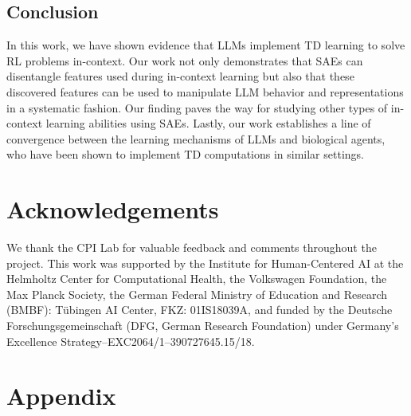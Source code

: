 \documentclass{article}
\begin{document}
\subsection{Conclusion}
In this work, we have shown evidence that LLMs implement TD learning to solve RL problems in-context. Our work not only demonstrates that SAEs can disentangle features used during in-context learning but also that these discovered features can be used to manipulate LLM behavior and representations in a systematic fashion. Our finding paves the way for studying other types of in-context learning abilities using SAEs. Lastly, our work establishes a line of convergence between the learning mechanisms of LLMs and biological agents, who have been shown to implement TD computations in similar settings.
\section*{Acknowledgements}
We thank the CPI Lab for valuable feedback and comments throughout the project. This work was supported by the Institute for Human-Centered AI at the Helmholtz Center for Computational Health, the Volkswagen Foundation, the Max Planck Society, the German Federal Ministry of Education and Research (BMBF): Tübingen AI Center, FKZ: 01IS18039A, and funded by the Deutsche Forschungsgemeinschaft (DFG, German Research Foundation) under Germany’s Excellence Strategy–EXC2064/1–390727645.15/18.
\newpage


\newpage
\appendix
\section{Appendix}
\end{document}
